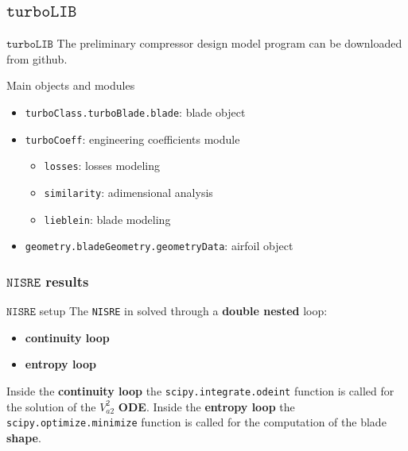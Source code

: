 \subsection{$\mathtt{turboLIB}$}
	\begin{frame}[fragile]{$\mathtt{turboLIB}$}
		The preliminary compressor design model program \href{https://github.com/antoniopucciarelli/turboLIB}{} can be downloaded from github.
		\begin{block}{Main objects and modules}
			\begin{itemize}
				\item \verb|turboClass.turboBlade.blade|: blade object
				\item \verb|turboCoeff|: engineering coefficients module
					\begin{itemize}
						\item \verb|losses|: losses modeling 
						\item \verb|similarity|: adimensional analysis
						\item \verb|lieblein|: blade modeling
					\end{itemize}
				\item \verb|geometry.bladeGeometry.geometryData|: airfoil object
			\end{itemize}
		\end{block}
	\end{frame}
\subsubsection{$\mathtt{NISRE}$ results}
	\begin{frame}[fragile]{$\mathtt{NISRE}$ setup}
		The \verb|NISRE| in solved through a \textbf{double nested} loop:
		\begin{itemize}
			\item \textbf{continuity loop}
			\item \textbf{entropy loop}
		\end{itemize}
		Inside the \textbf{continuity loop} the \verb|scipy.integrate.odeint| function is called for the solution of the $V_{a2}^2$ \textbf{ODE}.
		\newline
		\newline
		Inside the \textbf{entropy loop} the \verb|scipy.optimize.minimize| function is called for the computation of the blade \textbf{shape}.
	\end{frame}
